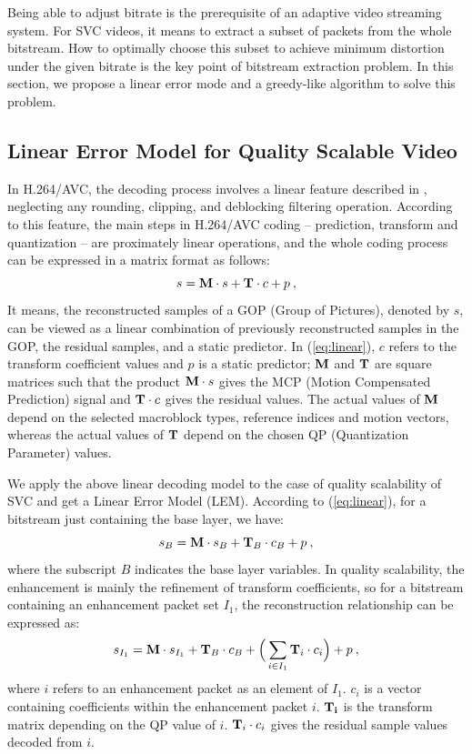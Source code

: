 \documentclass[journal]{IEEEtran}
\begin{document}
Being able to adjust bitrate is the prerequisite of an adaptive video streaming system. For SVC videos, it means to extract a subset of packets from the whole bitstream. How to optimally choose this subset to achieve minimum distortion under the given bitrate is the key point of bitstream extraction problem. In this section, we propose a linear error mode and a greedy-like algorithm to solve this problem.

\subsection{Linear Error Model for Quality Scalable Video}
\label{sec:model}

In H.264/AVC, the decoding process involves a linear feature described in \cite{Winken08}, neglecting any rounding, clipping, and deblocking filtering operation. According to this feature, the main steps in H.264/AVC coding -- prediction, transform and quantization -- are proximately linear operations, and the whole coding process can be expressed in a matrix format as follows:
\begin{equation}
\label{eq:linear}
s = {\rm\bf M} \cdot s + {\rm\bf T} \cdot c + p \: ,
\end{equation}
It means, the reconstructed samples of a GOP (Group of Pictures), denoted by $s$, can be viewed as a linear combination of previously reconstructed samples in the GOP, the residual samples, and a static predictor. In (\ref{eq:linear}), $c$ refers to the transform coefficient values and $p$ is a static predictor; ${\rm\bf M}$ and ${\rm\bf T}$ are square matrices such that the product ${\rm\bf M} \cdot s$ gives the MCP (Motion Compensated Prediction) signal and ${\rm\bf T} \cdot c$ gives the residual values. The actual values of ${\rm\bf M}$ depend on the selected macroblock types, reference indices and motion vectors, whereas the actual values of ${\rm\bf T}$ depend on the chosen QP (Quantization Parameter) values.

We apply the above linear decoding model to the case of quality scalability of SVC and get a Linear Error Model (LEM). According to (\ref{eq:linear}), for a bitstream just containing the base layer, we have:
\begin{equation}
\label{eq:base0}
s_{B} = {\rm\bf M} \cdot s_{B} + {\rm\bf T}_{B} \cdot c_{B} + p \: ,
\end{equation}
where the subscript $B$ indicates the base layer variables. In quality scalability, the enhancement is mainly the refinement of transform coefficients, so for a bitstream containing an enhancement packet set $I_1$, the reconstruction relationship can be expressed as:
\begin{equation}
\label{eq:subset1}
s_{I_1} = {\rm\bf M} \cdot s_{I_1} + {\rm\bf T}_{B} \cdot c_{B} + \Big( \sum_{i \in I_1}{\rm\bf T}_i \cdot c_i \Big) + p \: ,
\end{equation}
where $i$ refers to an enhancement packet as an element of $I_1$. $c_i$ is a vector containing coefficients within the enhancement packet $i$. ${\rm\bf T_i}$ is the transform matrix depending on the QP value of $i$. ${\rm\bf T}_i \cdot c_i$ gives the residual sample values decoded from $i$.
\end{document}
